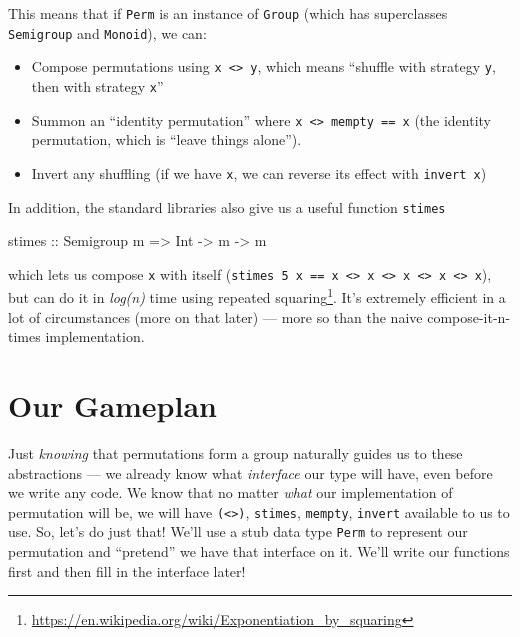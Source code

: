 \documentclass[]{article}
\newenvironment{Shaded}{}{}
\newcommand{\DataTypeTok}[1]{\textcolor[rgb]{0.56,0.13,0.00}{#1}}
\newcommand{\NormalTok}[1]{#1}
\newcommand{\OtherTok}[1]{\textcolor[rgb]{0.00,0.44,0.13}{#1}}
\renewcommand{\href}[2]{#2\footnote{\url{#1}}}
\begin{document}
This means that if \texttt{Perm} is an instance of \texttt{Group} (which has
superclasses \texttt{Semigroup} and \texttt{Monoid}), we can:

\begin{itemize}
\tightlist
\item
  Compose permutations using \texttt{x\ \textless{}\textgreater{}\ y}, which
  means ``shuffle with strategy \texttt{y}, then with strategy \texttt{x}''
\item
  Summon an ``identity permutation'' where
  \texttt{x\ \textless{}\textgreater{}\ mempty\ ==\ x} (the identity
  permutation, which is ``leave things alone'').
\item
  Invert any shuffling (if we have \texttt{x}, we can reverse its effect with
  \texttt{invert\ x})
\end{itemize}

In addition, the standard libraries also give us a useful function
\texttt{stimes}

\begin{Shaded}
\begin{Highlighting}[]
\OtherTok{stimes ::} \DataTypeTok{Semigroup}\NormalTok{ m }\OtherTok{=>} \DataTypeTok{Int} \OtherTok{{-}>}\NormalTok{ m }\OtherTok{{-}>}\NormalTok{ m}
\end{Highlighting}
\end{Shaded}

which lets us compose \texttt{x} with itself
(\texttt{stimes\ 5\ x\ ==\ x\ \textless{}\textgreater{}\ x\ \textless{}\textgreater{}\ x\ \textless{}\textgreater{}\ x\ \textless{}\textgreater{}\ x}),
but can do it in \emph{log(n)} time using
\href{https://en.wikipedia.org/wiki/Exponentiation_by_squaring}{repeated
squaring}. It's extremely efficient in a lot of circumstances (more on that
later) --- more so than the naive compose-it-n-times implementation.

\hypertarget{our-gameplan}{%
\section{Our Gameplan}\label{our-gameplan}}

Just \emph{knowing} that permutations form a group naturally guides us to these
abstractions --- we already know what \emph{interface} our type will have, even
before we write any code. We know that no matter \emph{what} our implementation
of permutation will be, we will have \texttt{(\textless{}\textgreater{})},
\texttt{stimes}, \texttt{mempty}, \texttt{invert} available to us to use. So,
let's do just that! We'll use a stub data type \texttt{Perm} to represent our
permutation and ``pretend'' we have that interface on it. We'll write our
functions first and then fill in the interface later!
\end{document}
